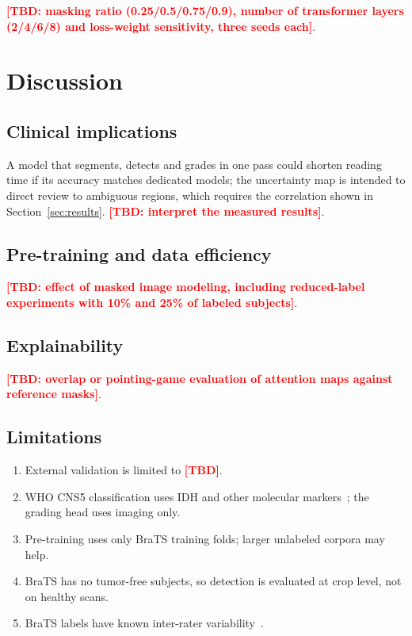 \documentclass[pdflatex,sn-mathphys-num]{sn-jnl}
\newcommand{\tbd}[1][]{\textcolor{red}{\textbf{[TBD#1]}}}
\begin{document}
\tbd[: masking ratio (0.25/0.5/0.75/0.9), number of transformer layers (2/4/6/8) and loss-weight sensitivity, three seeds each].

\section{Discussion}\label{sec:discussion}

\subsection{Clinical implications}
A model that segments, detects and grades in one pass could shorten reading time if its accuracy matches dedicated models; the uncertainty map is intended to direct review to ambiguous regions, which requires the correlation shown in Section~\ref{sec:results}. \tbd[: interpret the measured results].

\subsection{Pre-training and data efficiency}
\tbd[: effect of masked image modeling, including reduced-label experiments with 10\% and 25\% of labeled subjects].

\subsection{Explainability}
\tbd[: overlap or pointing-game evaluation of attention maps against reference masks].

\subsection{Limitations}
\begin{enumerate}
\item External validation is limited to \tbd{}.
\item WHO CNS5 classification uses IDH and other molecular markers~\cite{louis2021who}; the grading head uses imaging only.
\item Pre-training uses only BraTS training folds; larger unlabeled corpora may help.
\item BraTS has no tumor-free subjects, so detection is evaluated at crop level, not on healthy scans.
\item BraTS labels have known inter-rater variability~\cite{menze2015}.
\end{enumerate}
\end{document}
